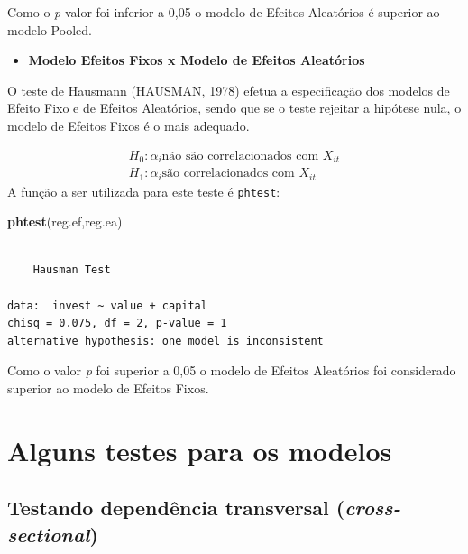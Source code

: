 \documentclass[12pt,brazil,oneside]{book}
\newenvironment{Shaded}{\begin{snugshade}}{\end{snugshade}}
\newcommand{\KeywordTok}[1]{\textcolor[rgb]{0.13,0.29,0.53}{\textbf{#1}}}
\newcommand{\NormalTok}[1]{#1}
\providecommand{\tightlist}{%
  \setlength{\itemsep}{0pt}\setlength{\parskip}{0pt}}
\begin{document}
Como o \emph{p} valor foi inferior a 0,05 o modelo de Efeitos Aleatórios é superior ao modelo Pooled.

\begin{itemize}
\tightlist
\item
  \textbf{Modelo Efeitos Fixos x Modelo de Efeitos Aleatórios}
\end{itemize}

O teste de Hausmann (HAUSMAN, \protect\hyperlink{ref-hausman1978}{1978}) efetua a especificação dos modelos de Efeito Fixo e de Efeitos Aleatórios, sendo que se o teste rejeitar a hipótese nula, o modelo de Efeitos Fixos é o mais adequado.

\[
 \begin{matrix}
H_0: \alpha_{i} \text{não são correlacionados com } X_{it} \\
H_1: \alpha_{i} \text{são correlacionados com } X_{it}
 \end{matrix}
\]
A função a ser utilizada para este teste é \texttt{phtest}:

\begin{Shaded}
\begin{Highlighting}[]
\KeywordTok{phtest}\NormalTok{(reg.ef,reg.ea)}
\end{Highlighting}
\end{Shaded}

\begin{verbatim}

    Hausman Test

data:  invest ~ value + capital
chisq = 0.075, df = 2, p-value = 1
alternative hypothesis: one model is inconsistent
\end{verbatim}

Como o valor \emph{p} foi superior a 0,05 o modelo de Efeitos Aleatórios foi considerado superior ao modelo de Efeitos Fixos.

\hypertarget{alguns-testes-para-os-modelos}{%
\section{Alguns testes para os modelos}\label{alguns-testes-para-os-modelos}}

\hypertarget{testando-dependencia-transversal-cross-sectional}{%
\subsection{\texorpdfstring{Testando dependência transversal (\emph{cross-sectional})}{Testando dependência transversal (cross-sectional)}}\label{testando-dependencia-transversal-cross-sectional}}
\end{document}
